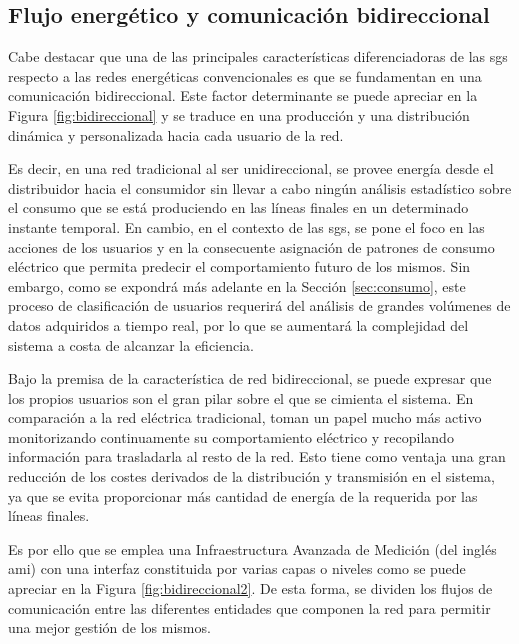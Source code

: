 \subsection{Flujo energético y comunicación bidireccional}

Cabe destacar que una de las principales características diferenciadoras de las \gls{sg}s respecto a las redes energéticas convencionales es que se fundamentan en una comunicación bidireccional. Este factor determinante se puede apreciar en la Figura \ref{fig:bidireccional} y se traduce en una producción y una distribución dinámica y personalizada hacia cada usuario de la red. 

\vspace{3mm}

Es decir, en una red tradicional al ser unidireccional, se provee energía desde el distribuidor hacia el consumidor sin llevar a cabo ningún análisis estadístico sobre el consumo que se está produciendo en las líneas finales en un determinado instante temporal. En cambio, en el contexto de las \gls{sg}s, se pone el foco en las acciones de los usuarios y en la consecuente asignación de patrones de consumo eléctrico que permita predecir el comportamiento futuro de los mismos. Sin embargo, como se expondrá más adelante en la Sección \ref{sec:consumo}, este proceso de clasificación de usuarios requerirá del análisis de grandes volúmenes de datos adquiridos a tiempo real, por lo que se aumentará la complejidad del sistema a costa de alcanzar la eficiencia. \cite{conventional}

\vspace{3mm}

Bajo la premisa de la característica de red bidireccional, se puede expresar que los propios usuarios son el gran pilar sobre el que se cimienta el sistema. En comparación a la red eléctrica tradicional, toman un papel mucho más activo monitorizando continuamente su comportamiento eléctrico y recopilando información para trasladarla al resto de la red. Esto tiene como ventaja una gran reducción de los costes derivados de la distribución y transmisión en el sistema, ya que se evita proporcionar más cantidad de energía de la requerida por las líneas finales. \cite{iotfutura}

\vspace{3mm}

Es por ello que se emplea una Infraestructura Avanzada de Medición (del inglés \gls{ami}) con una interfaz constituida por varias capas o niveles como se puede apreciar en la Figura \ref{fig:bidireccional2}. De esta forma, se dividen los flujos de comunicación entre las diferentes entidades que componen la red para permitir una mejor gestión de los mismos. \cite{us}


